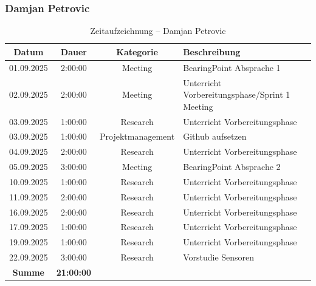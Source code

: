 \documentclass{article}
\begin{document}
\subsubsection*{Damjan Petrovic}
\begin{table}[H]
  \centering
  \begin{tabularx}{\textwidth}{|c|c|c|X|}
    \hline
    \rowcolor{black!10}\textbf{Datum} & \textbf{Dauer} & \textbf{Kategorie} & \textbf{Beschreibung} \\
    \hline
    01.09.2025 & 2:00:00 & Meeting           & BearingPoint Absprache 1 \\ \hline
    02.09.2025 & 2:00:00 & Meeting           & Unterricht Vorbereitungsphase/Sprint 1 Meeting \\ \hline
    03.09.2025 & 1:00:00 & Research          & Unterricht Vorbereitungsphase \\ \hline
    03.09.2025 & 1:00:00 & Projektmanagement & Github aufsetzen \\ \hline
    04.09.2025 & 2:00:00 & Research          & Unterricht Vorbereitungsphase \\ \hline
    05.09.2025 & 3:00:00 & Meeting           & BearingPoint Absprache 2 \\ \hline
    10.09.2025 & 1:00:00 & Research          & Unterricht Vorbereitungsphase \\ \hline
    11.09.2025 & 2:00:00 & Research          & Unterricht Vorbereitungsphase \\ \hline
    16.09.2025 & 2:00:00 & Research          & Unterricht Vorbereitungsphase \\ \hline
    17.09.2025 & 1:00:00 & Research          & Unterricht Vorbereitungsphase \\ \hline
    19.09.2025 & 1:00:00 & Research          & Unterricht Vorbereitungsphase \\ \hline
    22.09.2025 & 3:00:00 & Research          & Vorstudie Sensoren \\ \hline
    \rowcolor{black!10}\textbf{Summe} & \textbf{21:00:00} & & \\ \hline
  \end{tabularx}
  \caption{Zeitaufzeichnung – Damjan Petrovic}
  \label{tab:zeit-damjan}
\end{table}
\end{document}
